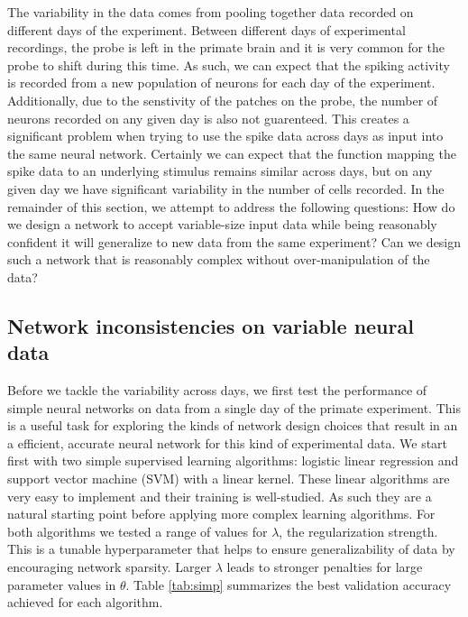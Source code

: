 \documentclass[12pt]{article}
\begin{document}
\indent The variability in the data comes from pooling together data recorded on different days of the experiment. Between different days of experimental recordings, the probe is left in the primate brain and it is very common for the probe to shift during this time. As such, we can expect that the spiking activity is recorded from a new population of neurons for each day of the experiment. Additionally, due to the senstivity of the patches on the probe, the number of neurons recorded on any given day is also not guarenteed. This creates a significant problem when trying to use the spike data across days as input into the same neural network. Certainly we can expect that the function mapping the spike data to an underlying stimulus remains similar across days, but on any given day we have significant variability in the number of cells recorded. In the remainder of this section, we attempt to address the following questions: How do we design a network to accept variable-size input data while being reasonably confident it will generalize to new data from the same experiment? Can we design such a network that is reasonably complex without over-manipulation of the data?

\subsection{Network inconsistencies on variable neural data}
\indent Before we tackle the variability across days, we first test the performance of simple neural networks on data from a single day of the primate experiment. This is a useful task for exploring the kinds of network design choices that result in an a efficient, accurate neural network for this kind of experimental data. We start first with two simple supervised learning algorithms:  logistic linear regression and support vector machine (SVM) with a linear kernel. These linear algorithms are very easy to implement and their training is well-studied. As such they are a natural starting point before applying more complex learning algorithms. For both algorithms we tested a range of values for $\lambda$, the regularization strength. This is a tunable hyperparameter that helps to ensure generalizability of data by encouraging network sparsity. Larger $\lambda$ leads to stronger penalties for large parameter values in $\theta$. Table \ref{tab:simp} summarizes the best validation accuracy achieved for each algorithm. \\
\end{document}
